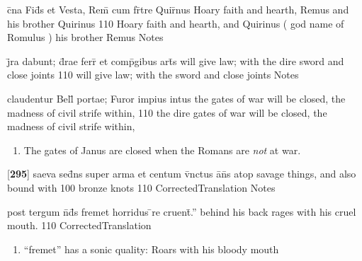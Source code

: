 \documentclass[]{book}
\begin{document}
\latline
  {c\={}na Fid\={}s et Vesta, Rem\={} cum fr\={}tre Quir\={\macron {\i}}nus}
  { Hoary faith and hearth, Remus and his brother Quirinus }
  {110}
  { Hoary faith and hearth,  and Quirinus ( god name of Romulus ) his brother Remus }
  { Notes }


\latline
  {j\={}ra dabunt; d\={\macron {\i}}rae ferr\={} et comp\={}gibus art\={\macron {\i}}s}
  { will give law; with the dire sword and close joints }
  {110}
  { will give law; with the sword and close joints }
  { Notes }


\latline
  {claudentur Bell\={\macron {\i}} portae; Furor impius intus}
  { the gates of war will be closed, the madness of civil strife within, }
  {110}
  { the dire gates of war will be closed, the madness of civil strife within, }
  { \begin{enumerate}
  	\item The gates of Janus are closed when the Romans are \emph{not} at war.
  \end{enumerate} }


\latline
  {[\textbf{295}] saeva sed\={}ns super arma et centum v\={\macron {\i}}nctus a\={}n\={\macron {\i}}s}
  { atop savage things, and also bound with 100 bronze knots }
  {110}
  { CorrectedTranslation }
  { Notes }


\latline
  {post tergum n\={}d\={\macron {\i}}s fremet horridus \={}re cruent\={}.''}
  { behind his back rages with his cruel mouth. }
  {110}
  { CorrectedTranslation }
  { \begin{enumerate}
  	\item ``fremet'' has a sonic quality:  Roars with his bloody mouth
  \end{enumerate} }
\end{document}
